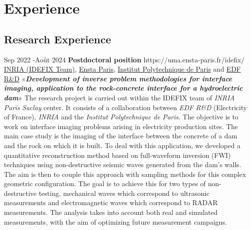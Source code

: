\documentclass[10pt]{article} %
\begin{document}
	
	


\section{Experience}
\subsection{Research Experience}
\job
{Sep 2022 -}{Août 2024}
{\textbf{Postdoctoral position}}
{https://uma.ensta-paris.fr/idefix/}
{\href{https://uma.ensta-paris.fr/idefix/}{INRIA (IDEFIX Team)}, \href{https://www.ensta-paris.fr/}{Ensta Paris},  \href{https://www.ip-paris.fr/}{Institut Polytechnique de Paris} and \href{https://www.edf.fr/groupe-edf/inventer-l-avenir-de-l-energie/r-d-un-savoir-faire-mondial/5-ans-edf-lab-saclay/edf-lab-chatou-75-ans-de-recherche }{EDF R\&D}}
{«\textbf{\textit{Development of inverse problem methodologies for interface imaging, application to the rock-concrete interface for a hydroelectric dam}}»}
{The research project is carried out within the IDEFIX team of \textit{INRIA Paris Saclay} center. It consists of a collaboration between \textit{EDF  R\&D} (Electricity of France), \textit{INRIA} and the \textit{Institut Polytechnique de Paris}. The objective is to work on interface imaging problems arising in electricity production sites.
The main case study is the imaging of the interface between the concrete of a dam and the rock on which it is built. To deal with this application, we developed a quantitative reconstruction method based on  full-waveform inversion (FWI) techniques using non-destructive seismic waves generated from the dam's walls. The aim is then to couple this approach with sampling methods for this complex geometric configuration. The goal is to achieve this for two types of non-destructive testing, mechanical waves which correspond to ultrasonic measurements and electromagnetic waves which correspond to RADAR measurements. The analysis takes into account both real and simulated measurements, with the aim of optimizing future measurement campaigns.
}
\end{document}
